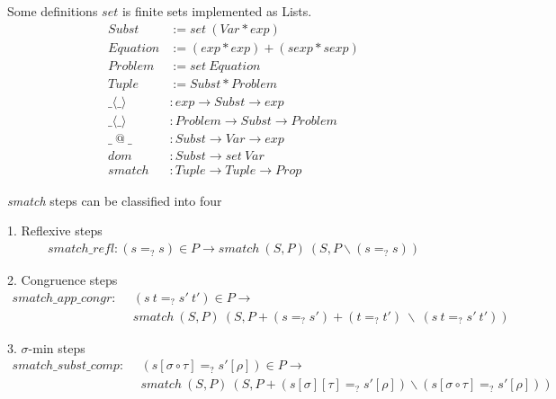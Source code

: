 \documentclass[10pt]{beamer}
\begin{document}
\begin{frame}[t]{Some definitions}
$set$ is finite sets implemented as Lists. 	
\begin{align*}
	Subst &:= set \ (Var * exp) \\
	Equation &:= (exp * exp) + (sexp * sexp) \\
	Problem &:= set \ Equation \\
	Tuple &:= Subst * Problem \\
	\_\langle \_\rangle &: exp \to Subst \to exp \\
	\_\langle \_\rangle &: Problem \to Subst \to Problem \\
	\_ \ @ \ \_ &: Subst \to Var \to exp \\
	dom &: Subst \to set \ Var \\
	smatch &: Tuple \to Tuple \to Prop
\end{align*}

\end{frame}

\begin{frame}[t]{\textit{smatch} steps can be classified into four}
\pause
\begin{block}{1. Reflexive steps}
	\begin{align*}
		smatch\_refl : (s=_?s) \in P \to smatch \ (S,P) \ (S, P \backslash (s=_?s)) 
	\end{align*}
\end{block}
\pause
\begin{block}{2. Congruence steps}
	\begin{align*}
		smatch\_app\_congr : \ \  &(s \ t =_? s' \ t') \in P \to \\
		                    & smatch \ (S,P) \ (S, P + (s =_? s') + (t=_?t') \ \backslash \ (s \ t =_? s' \ t'))  
	\end{align*}
\end{block}
\pause
\begin{block}{3. $\sigma$-min steps}
	\begin{align*}
		smatch\_subst\_comp : \ \ &(s[\sigma \circ \tau] =_? s'[\rho]) \in P \to \\
		                        & smatch \ (S,P) \ (S, P + (s[\sigma][\tau] =_? s'[\rho]) \backslash (s[\sigma \circ \tau]=_?s'[\rho])) 
	\end{align*}
\end{block}
\end{frame}
\end{document}
